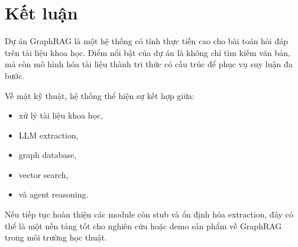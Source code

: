 \documentclass[12pt,a4paper]{article}
\begin{document}
\section{Kết luận}
Dự án GraphRAG là một hệ thống có tính thực tiễn cao cho bài toán hỏi đáp trên tài liệu khoa học. Điểm nổi bật của dự án là không chỉ tìm kiếm văn bản, mà còn mô hình hóa tài liệu thành tri thức có cấu trúc để phục vụ suy luận đa bước.

Về mặt kỹ thuật, hệ thống thể hiện sự kết hợp giữa:
\begin{itemize}[leftmargin=1.6em]
  \item xử lý tài liệu khoa học,
  \item LLM extraction,
  \item graph database,
  \item vector search,
  \item và agent reasoning.
\end{itemize}

Nếu tiếp tục hoàn thiện các module còn stub và ổn định hóa extraction, đây có thể là một nền tảng tốt cho nghiên cứu hoặc demo sản phẩm về GraphRAG trong môi trường học thuật.
\end{document}
